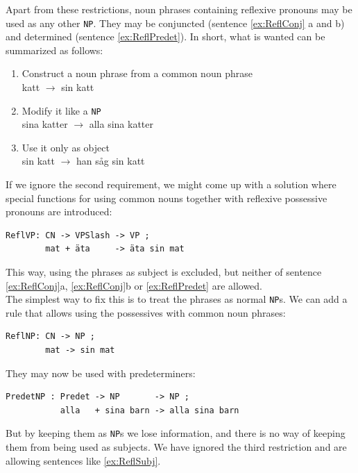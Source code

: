 \documentclass{report}
\begin{document}
Apart from these restrictions, noun phrases containing reflexive pronouns
may be used as any other \verb-NP-. They may be conjuncted (sentence
\ref{ex:ReflConj} a and b) and determined (sentence \ref{ex:ReflPredet}).
In short, what is wanted can be summarized as follows:\\
\begin{enumerate}
\item{
Construct a noun phrase from a common noun phrase \\
katt $\rightarrow$ sin katt} %
\item{Modify it like a \verb|NP|\\
sina katter $\rightarrow$ alla sina katter}
\item{Use it only as object\\
sin katt $\rightarrow$ han såg sin katt }
\end{enumerate}
If we ignore the second requirement, we might come up with a solution where
special functions for using common nouns
together with reflexive possessive pronouns are introduced:
\begin{verbatim}
ReflVP: CN -> VPSlash -> VP ;
        mat + äta     -> äta sin mat 
\end{verbatim}
This way, using the phrases as subject is excluded, but neither of sentence
\ref{ex:ReflConj}a, \ref{ex:ReflConj}b or \ref{ex:ReflPredet} are allowed.\\
The simplest way to fix this is to treat the phrases as normal \verb_NP_s.
We can add a rule that allows using the possessives with common noun phrases:
\begin{verbatim}
ReflNP: CN -> NP ;
        mat -> sin mat 
\end{verbatim}
They may now be used with predeterminers:
\begin{verbatim}
PredetNP : Predet -> NP       -> NP ;
           alla   + sina barn -> alla sina barn
\end{verbatim}
But by keeping them as \verb_NP_s we lose information, and there is no way of
keeping them from being used as subjects. We have ignored the third restriction
and are allowing sentences like \ref{ex:ReflSubj}.
\end{document}
